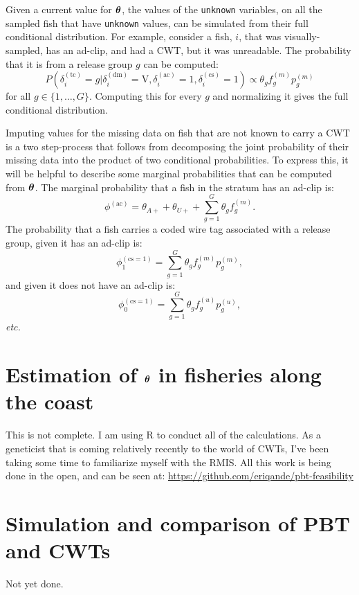 \documentclass[11pt]{article}
\makeatletter
\def\bm#1{\mathpalette\bmstyle{#1}}
\def\bmstyle#1#2{\mbox{\boldmath$#1#2$}}
\newcommand{\etc}{{\em etc.}\@\xspace}
\newcommand{\btheta}{\bm{\theta}}
\makeatother
\begin{document}
Given a current value for $\btheta$, the values of the {\tt unknown} variables, on all the sampled fish that have
{\tt unknown} values, can be simulated from their full conditional distribution.  For example,
consider a fish, $i$, that was visually-sampled, has an ad-clip, and had a CWT, but it was unreadable.  The 
probability that it is from a release group $g$ can be computed:
\[
P(\delta_i^{(\mathrm{tc})} = g | \delta_i^{(\mathrm{dm})}=\mathrm{V}, \delta_i^{(\mathrm{ac})} = 1, \delta_i^{(\mathrm{cs})} = 1)
\propto
\theta_g f_g^{(m)} p_g^{(m)}
\]
for all $g \in \{1,\ldots,G\}$. Computing this for every $g$ and normalizing it gives the full conditional distribution.

Imputing values for the missing data on fish that are not known to carry a CWT is a two step-process that follows
from decomposing the joint probability of their missing data into the product of two conditional probabilities.
To express this, it will be helpful to describe some marginal probabilities that can be computed from $\btheta$.  The marginal probability that a fish in the stratum has an ad-clip is:
\[
\phi^{(\mathrm{ac})} = \theta_{A+} + \theta_{U+} + \sum_{g=1}^G \theta_g f^{(m)}_g.
\]
The probability that a fish carries a coded wire tag associated with a release group, given it has an ad-clip is:
\[
\phi^{(\mathrm{cs}=1)}_1 =  \sum_{g=1}^G \theta_g f^{(m)}_g p^{(m)}_g,
\]
and given it does not have an ad-clip is:
\[
\phi^{(\mathrm{cs}=1)}_0 =  \sum_{g=1}^G \theta_g f^{(u)}_g p^{(u)}_g,
\]
\etc




\section{Estimation of $\btheta$ in fisheries along the coast}
This is not complete.  I am using R to conduct all of the calculations.  As a geneticist that is coming relatively
recently to the world of CWTs, I've been taking some time to familiarize myself with the RMIS.  All this work
is being done in the open, and can be seen at: \url{https://github.com/eriqande/pbt-feasibility}


\section{Simulation and comparison of PBT and CWTs}

Not yet done.



 
\end{document}
